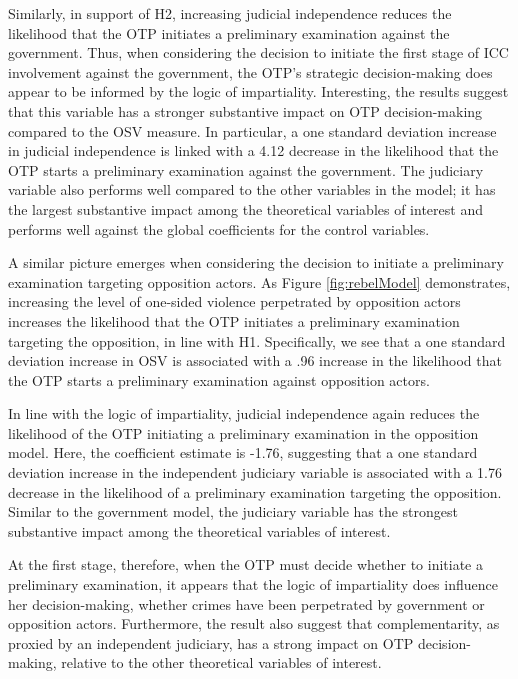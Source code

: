 Similarly, in support of H2, increasing judicial independence reduces the likelihood that the OTP initiates a preliminary examination against the government. Thus, when considering the decision to initiate the first stage of ICC involvement against the government, the OTP's strategic decision-making does appear to be informed by the logic of impartiality. Interesting, the results suggest that this variable has a stronger substantive impact on OTP decision-making compared to the OSV measure. In particular, a one standard deviation increase in judicial independence is linked with a 4.12 decrease in the likelihood that the OTP starts a preliminary examination against the government. The judiciary variable also performs well compared to the other variables in the model; it has the largest substantive impact among the theoretical variables of interest and performs well against the global coefficients for the control variables.

A similar picture emerges when considering the decision to initiate a preliminary examination targeting opposition actors. As Figure \ref{fig:rebelModel} demonstrates, increasing the level of one-sided violence perpetrated by opposition actors increases the likelihood that the OTP initiates a preliminary examination targeting the opposition, in line with H1. Specifically, we see that a one standard deviation increase in OSV is associated with a .96 increase in the likelihood that the OTP starts a preliminary examination against opposition actors.

In line with the logic of impartiality, judicial independence again reduces the likelihood of the OTP initiating a preliminary examination in the opposition model.  Here, the coefficient estimate is -1.76, suggesting that a one standard deviation increase in the independent judiciary variable is associated with a 1.76 decrease in the likelihood of a preliminary examination targeting the opposition. Similar to the government model, the judiciary variable has the strongest substantive impact among the theoretical variables of interest.

At the first stage, therefore, when the OTP must decide whether to initiate a preliminary examination, it appears that the logic of impartiality does influence her decision-making, whether crimes have been perpetrated by government or opposition actors. Furthermore, the result also suggest that complementarity, as proxied by an independent judiciary, has a strong impact on OTP decision-making, relative to the other theoretical variables of interest.

